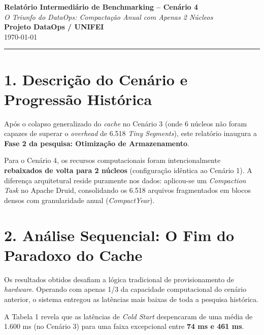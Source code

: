 \documentclass[12pt, a4paper]{article}
\begin{document}
\begin{center}
    \Large\textbf{Relatório Intermediário de Benchmarking -- Cenário 4} \\[0.2cm]
    \large\textit{O Triunfo do DataOps: Compactação Anual com Apenas 2 Núcleos} \\[0.5cm]
    \normalsize\textbf{Projeto DataOps / UNIFEI} \\
    \small{\today}
\end{center}

\vspace{0.5cm}
\noindent\rule{\textwidth}{1pt}

\section*{1. Descrição do Cenário e Progressão Histórica}
Após o colapso generalizado do \textit{cache} no Cenário 3 (onde 6 núcleos não foram capazes de superar o \textit{overhead} de 6.518 \textit{Tiny Segments}), este relatório inaugura a \textbf{Fase 2 da pesquisa: Otimização de Armazenamento}. 

Para o Cenário 4, os recursos computacionais foram intencionalmente \textbf{rebaixados de volta para 2 núcleos} (configuração idêntica ao Cenário 1). A diferença arquitetural reside puramente nos dados: aplicou-se um \textit{Compaction Task} no Apache Druid, consolidando os 6.518 arquivos fragmentados em blocos densos com granularidade anual (\textit{CompactYear}).

\section*{2. Análise Sequencial: O Fim do Paradoxo do Cache}
Os resultados obtidos desafiam a lógica tradicional de provisionamento de \textit{hardware}. Operando com apenas 1/3 da capacidade computacional do cenário anterior, o sistema entregou as latências mais baixas de toda a pesquisa histórica.

A Tabela 1 revela que as latências de \textit{Cold Start} despencaram de uma média de 1.600 ms (no Cenário 3) para uma faixa excepcional entre \textbf{74 ms e 461 ms}. 
\end{document}
